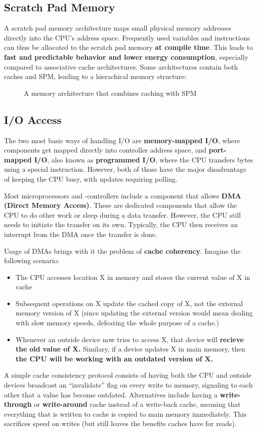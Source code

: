 \documentclass{report}
\newcommand{\tbf}{\textbf}
\newcommand*{\newpar}{\par\vspace{\baselineskip}\noindent} %
\begin{document}
\subsection{Scratch Pad Memory}
A scratch pad memory architecture maps small physical memory addresses directly into the CPU's address space. Frequently used variables and instructions can thus be allocated to the scratch pad memory \tbf{at compile time}. This leads to \tbf{fast and predictable behavior and lower energy consumption}, especially compared to associative cache architectures. Some architectures contain both caches and SPM, leading to a hierachical memory structure:
\begin{figure}[h!]
\centering

\caption{A memory architecture that combines caching with SPM}
\label{fig:memoryhierarchy}
\end{figure}
%
\subsection{I/O Access}
The two most basic ways of handling I/O are \tbf{memory-mapped I/O}, where components get mapped directly into controller address space, and \tbf{port-mapped I/O}, also known as \tbf{programmed I/O}, where the CPU transfers bytes using a special instruction. However, both of those have the major disadvantage of keeping the CPU busy, with updates requiring polling.
\newpar
Most microprocessors and -controllers include a component that allows \tbf{DMA (Direct Memory Access)}. These are dedicated components that allow the CPU to do other work or sleep during a data transfer. However, the CPU still needs to initiate the transfer on its own. Typically, the CPU then receives an interrupt from the DMA once the transfer is done.
\newpar
Usage of DMAs brings with it the problem of \tbf{cache coherency}. Imagine the following scenario:
\begin{itemize}
 \item The CPU accesses location X in memory and stores the current value of X in cache
 \item Subsequent operations on X update the cached copy of X, not the external memory version of X (since updating the external version would mean dealing with slow memory speeds, defeating the whole purpose of a cache.)
 \item Whenever an outside device now tries to access X, that device will \tbf{recieve the old value of X.} Similary, if a device updates X in main memory, then \tbf{the CPU will be working with an outdated version of X.}
\end{itemize}
A simple cache consistency protocol consists of having both the CPU and outside devices broadcast an ``invalidate'' flag on every write to memory, signaling to each other that a value has become outdated. Alternatives include having a \tbf{write-through} or \tbf{write-around} cache instead of a write-back cache, meaning that everything that is written to cache is copied to main memory immediately. This sacrifices speed on writes (but still leaves the benefits caches have for reads).
%
\end{document}
